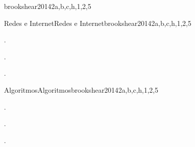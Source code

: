 \begin{syllabus}
\begin{unit}{\OSOverviewofOperatingSystems}{}{brookshear2014}{2}{a,b,c,h,1,2,5}
   \begin{topics}
      \item \OSOverviewofOperatingSystemsTopicRole
      \item \OSOverviewofOperatingSystemsTopicFunctionality
      \item \OSSchedulingandDispatchTopicProcesses
      \item \OSSchedulingandDispatchTopicSchedulers
   \end{topics}
   \begin{learningoutcomes}
      \item \OSOverviewofOperatingSystemsLOExplainTheFunctions [\Familiarity]
   \end{learningoutcomes}
\end{unit}

\begin{unit}{Redes e Internet}{Redes e Internet}{brookshear2014}{2}{a,b,c,h,1,2,5}
   \begin{topics}
      \item \NCIntroductionTopicOrganization
      \item \NCIntroductionTopicPhysical
      \item \NCNetworkedApplicationsTopicNaming
   \end{topics}
   \begin{learningoutcomes}
      \item \NCIntroductionLOArticulateThe [\Familiarity].
      \item \NCIntroductionLOListAndAppropriate  [\Familiarity].
      \item \NCIntroductionLODescribeTheOfNetworked [\Familiarity].
   \end{learningoutcomes}
\end{unit}

\begin{unit}{Algoritmos}{Algoritmos}{brookshear2014}{2}{a,b,c,h,1,2,5}
   \begin{topics}
      \item \SDFAlgorithmsandDesignTopicThe
      \item \SDFAlgorithmsandDesignTopicTheRole
      \item \SDFAlgorithmsandDesignTopicProblem
      \item \SDFAlgorithmsandDesignTopicFundamental
   \end{topics}
   \begin{learningoutcomes}
      \item \SDFAlgorithmsandDesignLODiscussTheAlgorithms [\Familiarity].
      \item \SDFAlgorithmsandDesignLODiscussHowMay [\Familiarity].
      \item \SDFAlgorithmsandDesignLOCreateAlgorithms [\Familiarity].
   \end{learningoutcomes}
\end{unit}


\end{syllabus}
